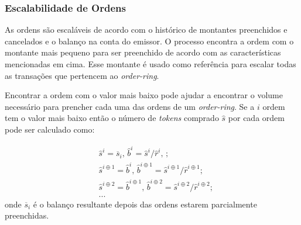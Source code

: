 \documentclass[UTF8,nofonts]{article}
\begin{document}
\begin{multicols}{2}
\begin{enumerate}
\subsubsection{Escalabilidade de Ordens\label{sec:order_scaling}}


As ordens são escaláveis de acordo com o histórico de montantes preenchidos e cancelados e o balanço na conta do emissor. O processo encontra a ordem com o montante mais pequeno para ser preenchido de acordo com as características mencionadas em cima. Esse montante é usado como referência para escalar todas as transações que pertencem ao \textit{order-ring}.


Encontrar a ordem com o valor mais baixo pode ajudar a encontrar o volume necessário para prencher cada uma das ordens de um \textit{order-ring}. Se a $i$ ordem tem o valor mais baixo então o número de \textit{tokens} comprado $\hat{s}$  por cada ordem pode ser calculado como:

\[
\begin{split}
&\hat{s}^{i}=\overline{s}_i\text{, } \hat{b}^{i}=\hat{s}^{i}/ \hat{r}^i\text{, }\text{;}\\
&\hat{s}^{i\oplus 1}=\hat{b}^i\text{, } \hat{b}^{i\oplus 1}=\hat{s}^{i\oplus 1}/ \hat{r}^{i\oplus 1}\text{;}\\
&\hat{s}^{i\oplus 2}=\hat{b}^{i\oplus 1}\text{, } \hat{b}^{i\oplus 2}=\hat{s}^{i\oplus 2}/ \hat{r}^{i\oplus 2}\text{;}\\
& ...
\end{split}
\]
onde $\overline{s}_i$ é o balanço resultante depois das ordens estarem parcialmente preenchidas.



\end{enumerate}
\end{multicols}
\end{document}
